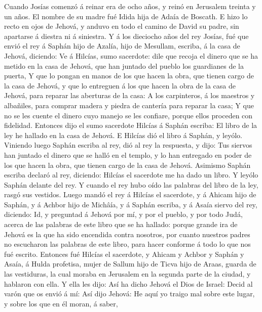  Cuando Josías comenzó á reinar era de ocho años, y reinó en
Jerusalem treinta y un años. El nombre de su madre fué Idida hija de
Adaía de Boscath.  E hizo lo recto en ojos de Jehová, y
anduvo en todo el camino de David su padre, sin apartarse á diestra ni á
siniestra.  Y á los dieciocho años del rey Josías, fué que
envió el rey á Saphán hijo de Azalía, hijo de Mesullam, escriba, á la
casa de Jehová, diciendo:  Ve á Hilcías, sumo sacerdote:
dile que recoja el dinero que se ha metido en la casa de Jehová, que han
juntado del pueblo los guardianes de la puerta,  Y que lo
pongan en manos de los que hacen la obra, que tienen cargo de la casa de
Jehová, y que lo entreguen á los que hacen la obra de la casa de Jehová,
para reparar las aberturas de la casa:  A los carpinteros, á
los maestros y albañiles, para comprar madera y piedra de cantería para
reparar la casa;  Y que no se les cuente el dinero cuyo
manejo se les confiare, porque ellos proceden con fidelidad.
 Entonces dijo el sumo sacerdote Hilcías á Saphán escriba:
El libro de la ley he hallado en la casa de Jehová. E Hilcías dió el
libro á Saphán, y leyólo.  Viniendo luego Saphán escriba al
rey, dió al rey la respuesta, y dijo: Tus siervos han juntado el dinero
que se halló en el templo, y lo han entregado en poder de los que hacen
la obra, que tienen cargo de la casa de Jehová.  Asimismo
Saphán escriba declaró al rey, diciendo: Hilcías el sacerdote me ha dado
un libro. Y leyólo Saphán delante del rey.  Y cuando el rey
hubo oído las palabras del libro de la ley, rasgó sus vestidos.
 Luego mandó el rey á Hilcías el sacerdote, y á Ahicam hijo
de Saphán, y á Achbor hijo de Michâía, y á Saphán escriba, y á Asaía
siervo del rey, diciendo:  Id, y preguntad á Jehová por mí,
y por el pueblo, y por todo Judá, acerca de las palabras de este libro
que se ha hallado: porque grande ira de Jehová es la que ha sido
encendida contra nosotros, por cuanto nuestros padres no escucharon las
palabras de este libro, para hacer conforme á todo lo que nos fué
escrito.  Entonces fué Hilcías el sacerdote, y Ahicam y
Achbor y Saphán y Asaía, á Hulda profetisa, mujer de Sallum hijo de
Ticva hijo de Araas, guarda de las vestiduras, la cual moraba en
Jerusalem en la segunda parte de la ciudad, y hablaron con ella.
 Y ella les dijo: Así ha dicho Jehová el Dios de Israel:
Decid al varón que os envió á mí:  Así dijo Jehová: He aquí
yo traigo mal sobre este lugar, y sobre los que en él moran, á saber,
